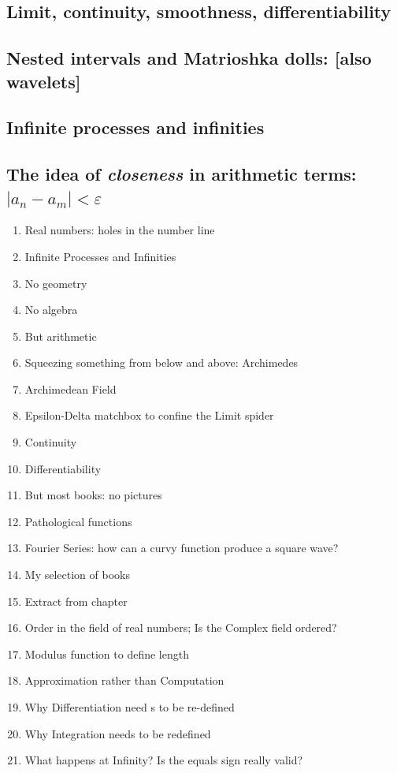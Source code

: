 \documentclass[
  a4paper,
]{article}
\providecommand{\tightlist}{%
  \setlength{\itemsep}{0pt}\setlength{\parskip}{0pt}}
\begin{document}
\subsection{Limit, continuity, smoothness,
differentiability}\label{limit-continuity-smoothness-differentiability}

\subsection{Nested intervals and Matrioshka dolls: {[}also
wavelets{]}}\label{nested-intervals-and-matrioshka-dolls-also-wavelets}

\subsection{Infinite processes and
infinities}\label{infinite-processes-and-infinities}

\subsection{\texorpdfstring{The idea of \emph{closeness} in arithmetic
terms:
\(| a_n - a_m | < \varepsilon\)}{The idea of closeness in arithmetic terms: \textbar{} a\_n - a\_m \textbar{} \textless{} \textbackslash varepsilon}}\label{the-idea-of-closeness-in-arithmetic-terms-a_n---a_m-varepsilon}

\begin{enumerate}
\tightlist
\item
  Real numbers: holes in the number line
\item
  Infinite Processes and Infinities
\item
  No geometry
\item
  No algebra
\item
  But arithmetic
\item
  Squeezing something from below and above: Archimedes
\item
  Archimedean Field
\item
  Epsilon-Delta matchbox to confine the Limit spider
\item
  Continuity
\item
  Differentiability
\item
  But most books: no pictures
\item
  Pathological functions
\item
  Fourier Series: how can a curvy function produce a square wave?
\item
  My selection of books
\item
  Extract from chapter
\item
  Order in the field of real numbers; Is the Complex field ordered?
\item
  Modulus function to define length
\item
  Approximation rather than Computation
\item
  Why Differentiation need s to be re-defined
\item
  Why Integration needs to be redefined
\item
  What happens at Infinity? Is the equals sign really valid?
\end{enumerate}
\end{document}
